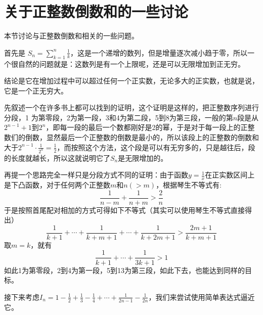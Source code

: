 
\section{关于正整数倒数和的一些讨论}
\label{sec:sum-reciprocal-of-positive-integer}

本节讨论与正整数倒数和相关的一些问题。

首先是 $S_n=\sum_{k=1}^n\frac{1}{k}$，这是一个递增的数列，但是增量逐次减小趋于零，所以一个很自然的问题就是：这数列是有一个上限呢，还是可以无限增加到正无穷。

结论是它在增加过程中可以超过任何一个正实数，无论多大的正实数，也就是说，它是一个正无穷大。

先叙述一个在许多书上都可以找到的证明，这个证明是这样的，把正整数序列进行分段，1 为第零段，2为第一段，3和4为第二段，5到8为第三段，一般的第$n$段是从$2^{n-1}+1$到$2^n$，即每一段的最后一个数都刚好是2的幂，于是对于每一段上的正整数们的倒数，显然最后一个正整数的倒数是最小的，所以该段上的正整数的倒数和大于$2^{n-1}\cdot \frac{1}{2^n}=\frac{1}{2}$，而按照这个方法，这个段是可以有无穷多的，只是越往后，段的长度就越长，所以这就说明它了$S_n$是无限增加的。

再提一个思路完全一样只是分段方式不同的证明：由于函数$y=\frac{1}{x}$在正实数区间上是下凸函数，对于任何两个正整数$m$和$n(>m)$，根据琴生不等式有:
\begin{equation*}
  \frac{1}{n-m} + \frac{1}{n+m} > \frac{2}{n}
\end{equation*}
于是按照首尾配对相加的方式可得如下不等式（其实可以使用琴生不等式直接得出）
\begin{equation*}
  \frac{1}{k+1} + \cdots + \frac{1}{k+m+1} + \cdots + \frac{1}{k+2m+1} > \frac{2m+1}{k+m+1}
\end{equation*}
取$m=k$，就有
\begin{equation*}
  \frac{1}{k+1} + \cdots + \frac{1}{3k+1} > 1
\end{equation*}
如此1为第零段，2到4为第一段，5到13为第三段，如此下去，也能达到同样的目标。

接下来考虑$I_n=1-\frac{1}{2}+\frac{1}{3}-\frac{1}{4}+\cdots+\frac{1}{2n-1}-\frac{1}{2n}$，我们来尝试使用简单表达式逼近它。

